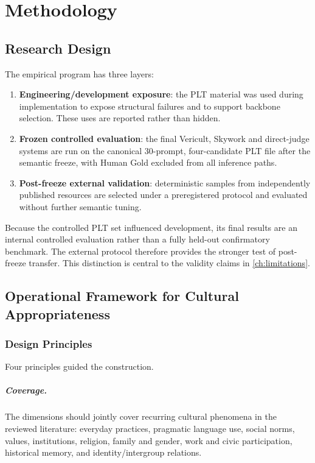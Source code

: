 \chapter{Methodology}
\label{ch:methodology}

\section{Research Design}
The empirical program has three layers:
\begin{enumerate}
    \item \textbf{Engineering/development exposure}: the PLT material was used during implementation to expose structural failures and to support backbone selection. These uses are reported rather than hidden.
    \item \textbf{Frozen controlled evaluation}: the final Vericult, Skywork and direct-judge systems are run on the canonical 30-prompt, four-candidate PLT file after the semantic freeze, with Human Gold excluded from all inference paths.
    \item \textbf{Post-freeze external validation}: deterministic samples from independently published resources are selected under a preregistered protocol and evaluated without further semantic tuning.
\end{enumerate}

Because the controlled PLT set influenced development, its final results are an internal controlled evaluation rather than a fully held-out confirmatory benchmark. The external protocol therefore provides the stronger test of post-freeze transfer. This distinction is central to the validity claims in \cref{ch:limitations}.

\section{Operational Framework for Cultural Appropriateness}

\subsection{Design Principles}
Four principles guided the construction.

\paragraph{Coverage.}
The dimensions should jointly cover recurring cultural phenomena in the reviewed literature: everyday practices, pragmatic language use, social norms, values, institutions, religion, family and gender, work and civic participation, historical memory, and identity/intergroup relations.

